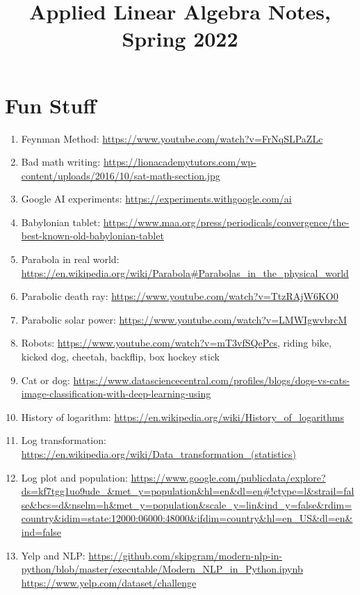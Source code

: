 \documentclass{article}
\title{Applied Linear Algebra Notes, Spring 2022}
\date
\begin{document}
\maketitle
\large


\tableofcontents


\section{Fun Stuff}

\begin{enumerate}
\item Feynman Method: \url{https://www.youtube.com/watch?v=FrNqSLPaZLc}
\item Bad math writing: \url{https://lionacademytutors.com/wp-content/uploads/2016/10/sat-math-section.jpg}
\item Google AI experiments: \url{https://experiments.withgoogle.com/ai}
\item Babylonian tablet: \url{https://www.maa.org/press/periodicals/convergence/the-best-known-old-babylonian-tablet}
\item Parabola in real world: \url{https://en.wikipedia.org/wiki/Parabola#Parabolas_in_the_physical_world}
\item Parabolic death ray: \url{https://www.youtube.com/watch?v=TtzRAjW6KO0}
\item Parabolic solar power: \url{https://www.youtube.com/watch?v=LMWIgwvbrcM}
\item Robots: \url{https://www.youtube.com/watch?v=mT3vfSQePcs}, riding bike, kicked dog, cheetah, backflip, box hockey stick
\item Cat or dog: \url{https://www.datasciencecentral.com/profiles/blogs/dogs-vs-cats-image-classification-with-deep-learning-using}
\item History of logarithm: \url{https://en.wikipedia.org/wiki/History_of_logarithms}
\item Log transformation: \url{https://en.wikipedia.org/wiki/Data_transformation_(statistics)}
\item Log plot and population: \url{https://www.google.com/publicdata/explore?ds=kf7tgg1uo9ude_&met_y=population&hl=en&dl=en#!ctype=l&strail=false&bcs=d&nselm=h&met_y=population&scale_y=lin&ind_y=false&rdim=country&idim=state:12000:06000:48000&ifdim=country&hl=en_US&dl=en&ind=false} 
\item Yelp and NLP: \url{https://github.com/skipgram/modern-nlp-in-python/blob/master/executable/Modern_NLP_in_Python.ipynb} \url{https://www.yelp.com/dataset/challenge}

\end{enumerate}
\end{document}
